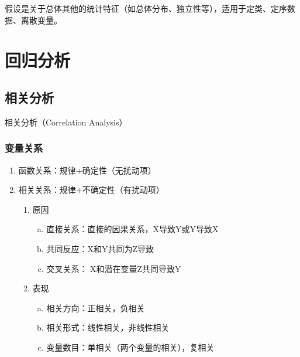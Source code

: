 \documentclass[12pt]{book}
\begin{document}
假设是关于总体其他的统计特征（如总体分布、独立性等），适用于定类、定序数据、离散变量。






\section{回归分析}


\subsection{相关分析}



相关分析（Correlation Analysis）


\subsubsection{变量关系}

\begin{enumerate}[1.]
    \item 函数关系：规律+确定性（无扰动项）  
    \item 相关关系：规律+不确定性（有扰动项）  
    \begin{enumerate}[(1)]
        \item 原因  
        \begin{enumerate}[a.]
            \item 直接关系：直接的因果关系，X导致Y或Y导致X  
            \item 共同反应：X和Y共同为Z导致  
            \item 交叉关系： X和潜在变量Z共同导致Y  
        \end{enumerate}
        \item 表现  
        \begin{enumerate}[a.]
            \item 相关方向：正相关，负相关   
            \item 相关形式：线性相关，非线性相关  
            \item 变量数目：单相关（两个变量的相关），复相关  
        \end{enumerate}
    \end{enumerate}
\end{enumerate}
\end{document}
